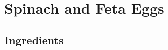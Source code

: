 \thispagestyle{fancy}
\section{Spinach and Feta Eggs}
\AddToShipoutPicture*{\FetaSpinachEggs}

\subsection*{Ingredients}